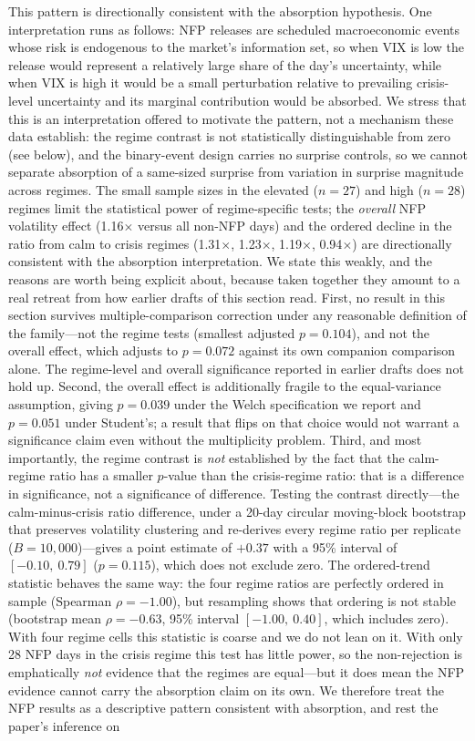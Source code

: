 \documentclass[12pt,a4paper]{article}
\begin{document}
This pattern is directionally consistent with the absorption hypothesis. One interpretation runs as follows: NFP releases are scheduled macroeconomic events whose risk is endogenous to the market's information set, so when VIX is low the release would represent a relatively large share of the day's uncertainty, while when VIX is high it would be a small perturbation relative to prevailing crisis-level uncertainty and its marginal contribution would be absorbed. We stress that this is an interpretation offered to motivate the pattern, not a mechanism these data establish: the regime contrast is not statistically distinguishable from zero (see below), and the binary-event design carries no surprise controls, so we cannot separate absorption of a same-sized surprise from variation in surprise magnitude across regimes. The small sample sizes in the elevated ($n = 27$) and high ($n = 28$) regimes limit the statistical power of regime-specific tests; the \textit{overall} NFP volatility effect (1.16$\times$ versus all non-NFP days) and the ordered decline in the ratio from calm to crisis regimes (1.31$\times$, 1.23$\times$, 1.19$\times$, 0.94$\times$) are directionally consistent with the absorption interpretation. We state this weakly, and the reasons are worth being explicit about, because taken together they amount to a real retreat from how earlier drafts of this section read. First, no result in this section survives multiple-comparison correction under any reasonable definition of the family---not the regime tests (smallest adjusted $p = 0.104$), and not the overall effect, which adjusts to $p = 0.072$ against its own companion comparison alone. The regime-level and overall significance reported in earlier drafts does not hold up. Second, the overall effect is additionally fragile to the equal-variance assumption, giving $p = 0.039$ under the Welch specification we report and $p = 0.051$ under Student's; a result that flips on that choice would not warrant a significance claim even without the multiplicity problem. Third, and most importantly, the regime contrast is \textit{not} established by the fact that the calm-regime ratio has a smaller $p$-value than the crisis-regime ratio: that is a difference in significance, not a significance of difference. Testing the contrast directly---the calm-minus-crisis ratio difference, under a 20-day circular moving-block bootstrap that preserves volatility clustering and re-derives every regime ratio per replicate ($B = 10{,}000$)---gives a point estimate of $+0.37$ with a 95\% interval of $[-0.10,\ 0.79]$ ($p = 0.115$), which does not exclude zero. The ordered-trend statistic behaves the same way: the four regime ratios are perfectly ordered in sample (Spearman $\rho = -1.00$), but resampling shows that ordering is not stable (bootstrap mean $\rho = -0.63$, 95\% interval $[-1.00,\ 0.40]$, which includes zero). With four regime cells this statistic is coarse and we do not lean on it. With only 28 NFP days in the crisis regime this test has little power, so the non-rejection is emphatically \textit{not} evidence that the regimes are equal---but it does mean the NFP evidence cannot carry the absorption claim on its own. We therefore treat the NFP results as a descriptive pattern consistent with absorption, and rest the paper's inference on 
\end{document}
